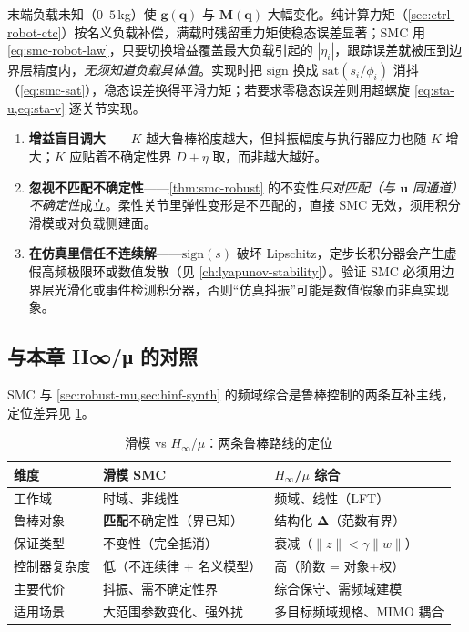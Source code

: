 \begin{example}[二连杆机械臂的负载不确定]
末端负载未知（$0$--$5\,$kg）使 $\mathbf g(\mathbf q)$ 与 $\mathbf M(\mathbf q)$ 大幅变化。纯计算力矩（\cref{sec:ctrl-robot-ctc}）按名义负载补偿，满载时残留重力矩使稳态误差显著；SMC 用 \cref{eq:smc-robot-law}，只要切换增益覆盖最大负载引起的 $|\eta_i|$，跟踪误差就被压到边界层精度内，\emph{无须知道负载具体值}。实现时把 $\mathrm{sign}$ 换成 $\mathrm{sat}(s_i/\phi_i)$ 消抖（\cref{eq:smc-sat}），稳态误差换得平滑力矩；若要求零稳态误差则用超螺旋 \cref{eq:sta-u,eq:sta-v} 逐关节实现。
\end{example}

\begin{pitfall}
\begin{enumerate}
  \item \textbf{增益盲目调大}——$K$ 越大鲁棒裕度越大，但抖振幅度与执行器应力也随 $K$ 增大；$K$ 应贴着不确定性界 $D+\eta$ 取，而非越大越好。
  \item \textbf{忽视不匹配不确定性}——\cref{thm:smc-robust} 的不变性\emph{只对匹配（与 $\mathbf u$ 同通道）不确定性}成立。柔性关节里弹性变形是不匹配的，直接 SMC 无效，须用积分滑模或对负载侧建面。
  \item \textbf{在仿真里信任不连续解}——$\mathrm{sign}(s)$ 破坏 Lipschitz，定步长积分器会产生虚假高频极限环或数值发散（见 \cref{ch:lyapunov-stability}）。验证 SMC 必须用边界层光滑化或事件检测积分器，否则“仿真抖振”可能是数值假象而非真实现象。
\end{enumerate}
\end{pitfall}

\subsection{与本章 H∞/μ 的对照}
SMC 与 \cref{sec:robust-mu,sec:hinf-synth} 的频域综合是鲁棒控制的两条互补主线，定位差异见 \cref{tab:smc-vs-hinf}。

\begin{table}[H]\centering\small
\caption{滑模 vs $H_\infty$/$\mu$：两条鲁棒路线的定位}
\label{tab:smc-vs-hinf}
\begin{tabular}{lll}
\toprule
维度 & 滑模 SMC & $H_\infty$/$\mu$ 综合 \\
\midrule
工作域 & 时域、非线性 & 频域、线性（LFT） \\
鲁棒对象 & \textbf{匹配}不确定性（界已知） & 结构化 $\boldsymbol\Delta$（范数有界） \\
保证类型 & 不变性（完全抵消） & 衰减（$\|z\|<\gamma\|w\|$） \\
控制器复杂度 & 低（不连续律 + 名义模型） & 高（阶数 = 对象+权） \\
主要代价 & 抖振、需不确定性界 & 综合保守、需频域建模 \\
适用场景 & 大范围参数变化、强外扰 & 多目标频域规格、MIMO 耦合 \\
\bottomrule
\end{tabular}
\end{table}

